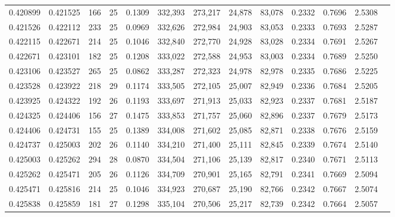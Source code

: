 \begin{tabular}{rrrrrrrrrrrrr}
0.420899 & 0.421525 &   166 &  25 &                                     0.1309 & 332,393 & 273,217 &  24,878 &  83,078 & 0.2332 & 0.7696 & 2.5308 \\
0.421526 & 0.422112 &   233 &  25 &                                     0.0969 & 332,626 & 272,984 &  24,903 &  83,053 & 0.2333 & 0.7693 & 2.5287 \\
0.422115 & 0.422671 &   214 &  25 &                                     0.1046 & 332,840 & 272,770 &  24,928 &  83,028 & 0.2334 & 0.7691 & 2.5267 \\
0.422671 & 0.423101 &   182 &  25 &                                     0.1208 & 333,022 & 272,588 &  24,953 &  83,003 & 0.2334 & 0.7689 & 2.5250 \\
0.423106 & 0.423527 &   265 &  25 &                                     0.0862 & 333,287 & 272,323 &  24,978 &  82,978 & 0.2335 & 0.7686 & 2.5225 \\
0.423528 & 0.423922 &   218 &  29 &                                     0.1174 & 333,505 & 272,105 &  25,007 &  82,949 & 0.2336 & 0.7684 & 2.5205 \\
0.423925 & 0.424322 &   192 &  26 &                                     0.1193 & 333,697 & 271,913 &  25,033 &  82,923 & 0.2337 & 0.7681 & 2.5187 \\
0.424325 & 0.424406 &   156 &  27 &                                     0.1475 & 333,853 & 271,757 &  25,060 &  82,896 & 0.2337 & 0.7679 & 2.5173 \\
0.424406 & 0.424731 &   155 &  25 &                                     0.1389 & 334,008 & 271,602 &  25,085 &  82,871 & 0.2338 & 0.7676 & 2.5159 \\
0.424737 & 0.425003 &   202 &  26 &                                     0.1140 & 334,210 & 271,400 &  25,111 &  82,845 & 0.2339 & 0.7674 & 2.5140 \\
0.425003 & 0.425262 &   294 &  28 &                                     0.0870 & 334,504 & 271,106 &  25,139 &  82,817 & 0.2340 & 0.7671 & 2.5113 \\
0.425262 & 0.425471 &   205 &  26 &                                     0.1126 & 334,709 & 270,901 &  25,165 &  82,791 & 0.2341 & 0.7669 & 2.5094 \\
0.425471 & 0.425816 &   214 &  25 &                                     0.1046 & 334,923 & 270,687 &  25,190 &  82,766 & 0.2342 & 0.7667 & 2.5074 \\
0.425838 & 0.425859 &   181 &  27 &                                     0.1298 & 335,104 & 270,506 &  25,217 &  82,739 & 0.2342 & 0.7664 & 2.5057 \\

\end{tabular}
